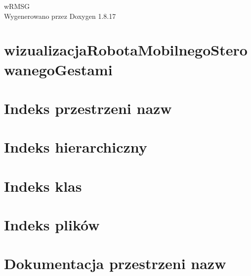 \let\mypdfximage\pdfximage\def\pdfximage{\immediate\mypdfximage}\documentclass[twoside]{book}
\newcommand{\+}{\discretionary{\mbox{\scriptsize$\hookleftarrow$}}{}{}}
\newcommand{\clearemptydoublepage}{%
  \newpage{\pagestyle{empty}\cleardoublepage}%
}
\begin{document}
\hypersetup{pageanchor=false,
             bookmarksnumbered=true,
             pdfencoding=unicode
            }
\begin{titlepage}
\vspace*{7cm}
\begin{center}%
{\Large w\+R\+M\+SG }\\
\vspace*{1cm}
{\large Wygenerowano przez Doxygen 1.8.17}\\
\end{center}
\end{titlepage}
\clearemptydoublepage
{}
\tableofcontents
\clearemptydoublepage
{}
\hypersetup{pageanchor=true}

\chapter{wizualizacja\+Robota\+Mobilnego\+Sterowanego\+Gestami}
\label{md__media_sf__d__d_r_i_v_e__studia_6semestr_wds_wizualizacja_robota_mobilnego_sterowanego_gestami__r_e_a_d_m_e}

\chapter{Indeks przestrzeni nazw}

\chapter{Indeks hierarchiczny}

\chapter{Indeks klas}

\chapter{Indeks plików}

\chapter{Dokumentacja przestrzeni nazw}


\end{document}
